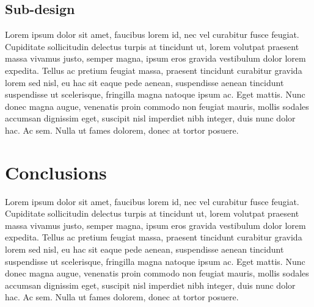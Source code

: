   \subsection{Sub-design}
Lorem ipsum dolor sit amet, faucibus lorem id, nec vel curabitur fusce feugiat. Cupiditate sollicitudin delectus turpis at tincidunt ut, lorem volutpat praesent massa vivamus justo, semper magna, ipsum eros gravida vestibulum dolor lorem expedita. Tellus ac pretium feugiat massa, praesent tincidunt curabitur gravida lorem sed nisl, eu hac sit eaque pede aenean, suspendisse aenean tincidunt suspendisse ut scelerisque, fringilla magna natoque ipsum ac. Eget mattis. Nunc donec magna augue, venenatis proin commodo non feugiat mauris, mollis sodales accumsan dignissim eget, suscipit nisl imperdiet nibh integer, duis nunc dolor hac. Ac sem. Nulla ut fames dolorem, donec at tortor posuere.
 
  
  \section{Conclusions}
 Lorem ipsum dolor sit amet, faucibus lorem id, nec vel curabitur fusce feugiat. Cupiditate sollicitudin delectus turpis at tincidunt ut, lorem volutpat praesent massa vivamus justo, semper magna, ipsum eros gravida vestibulum dolor lorem expedita. Tellus ac pretium feugiat massa, praesent tincidunt curabitur gravida lorem sed nisl, eu hac sit eaque pede aenean, suspendisse aenean tincidunt suspendisse ut scelerisque, fringilla magna natoque ipsum ac. Eget mattis. Nunc donec magna augue, venenatis proin commodo non feugiat mauris, mollis sodales accumsan dignissim eget, suscipit nisl imperdiet nibh integer, duis nunc dolor hac. Ac sem. Nulla ut fames dolorem, donec at tortor posuere.

